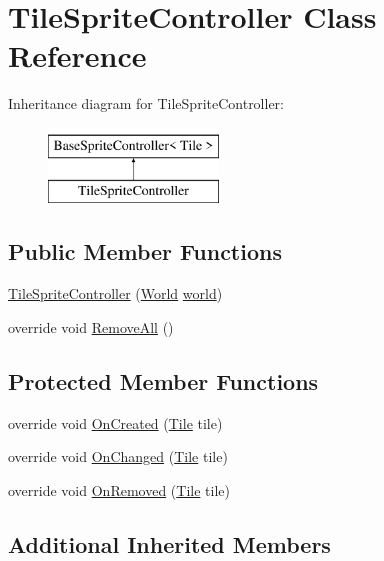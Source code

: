 \hypertarget{class_tile_sprite_controller}{}\section{Tile\+Sprite\+Controller Class Reference}
\label{class_tile_sprite_controller}
Inheritance diagram for Tile\+Sprite\+Controller\+:\begin{figure}[H]
\begin{center}
\leavevmode
\includegraphics[height=2.000000cm]{class_tile_sprite_controller}
\end{center}
\end{figure}
\subsection*{Public Member Functions}
\begin{DoxyCompactItemize}
\item 
\hyperlink{class_tile_sprite_controller_a09d6b482d02309ed99195801d1ee4829}{Tile\+Sprite\+Controller} (\hyperlink{class_world}{World} \hyperlink{class_base_sprite_controller_a593ea6a31165eff51a0acffc12ea65ca}{world})
\item 
override void \hyperlink{class_tile_sprite_controller_a1d4cb3a617ce9c1fad7b5f759368bb36}{Remove\+All} ()
\end{DoxyCompactItemize}
\subsection*{Protected Member Functions}
\begin{DoxyCompactItemize}
\item 
override void \hyperlink{class_tile_sprite_controller_ad8d501cfecc7f60ae7b62c6b6290bd63}{On\+Created} (\hyperlink{class_tile}{Tile} tile)
\item 
override void \hyperlink{class_tile_sprite_controller_a05a9fbf8a51dd3c38733339c3f1cb143}{On\+Changed} (\hyperlink{class_tile}{Tile} tile)
\item 
override void \hyperlink{class_tile_sprite_controller_a758686aebdddadb7ea4154468fdb76bf}{On\+Removed} (\hyperlink{class_tile}{Tile} tile)
\end{DoxyCompactItemize}
\subsection*{Additional Inherited Members}


